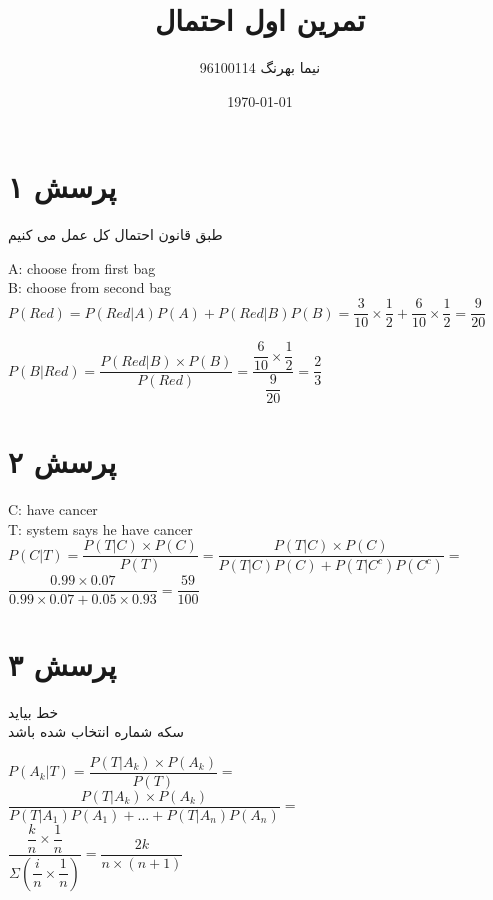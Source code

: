\documentclass[a4paper]{article}
\title{تمرین اول احتمال}
\author{نیما بهرنگ 96100114}
\date{\today}
\begin{document}
\maketitle
{}


\section*{پرسش ۱}
طبق قانون احتمال کل عمل می کنیم
\begin{enumerate}
\begin{latin}
\item{}
A: choose from first bag\\
B: choose from second bag\\
$P(Red)=P(Red|A)P(A) + P(Red|B)P(B) = \dfrac{3}{10}\times\dfrac{1}{2} + \dfrac{6}{10}\times\dfrac{1}{2}=\dfrac{9}{20}$

\item{}
$P(B|Red) = \dfrac{P(Red|B)\times P(B)}{P(Red)} = \dfrac{\dfrac{6}{10} \times \dfrac{1}{2}}{\dfrac{9}{20}} = \dfrac{2}{3}$
\end{latin}
\end{enumerate}
\pagebreak
\section*{پرسش ۲}
\begin{latin}
C: have cancer\\
T: system says he have cancer\\
$P(C|T) = \dfrac{P(T|C) \times P(C)}{P(T)} = \dfrac{P(T|C) \times P(C)}{P(T|C)P(C)+P(T|C^c)P(C^c)} =$\\
$ \dfrac{0.99 \times 0.07}{0.99\times 0.07+0.05\times 0.93}=\dfrac{59}{100}$
\end{latin}
\pagebreak
\section*{پرسش ۳}
 خط بیاید
\\
سکه شماره 
انتخاب شده باشد
\\
\begin{latin}
$ P(A_k|T) = \dfrac{P(T|A_k) \times P(A_k)}{P(T)} =$
$ \dfrac{P(T|A_k) \times P(A_k)}{P(T|A_1)P(A_1) + ... + P(T|A_n) P(A_n)} = $\\
$ \dfrac{\dfrac{k}{n} \times \dfrac{1}{n}}{\Sigma (\dfrac{i}{n} \times \dfrac{1}{n}) } = \dfrac{2k}{n \times (n+1)} $
\end{latin}
\pagebreak
\end{document}
